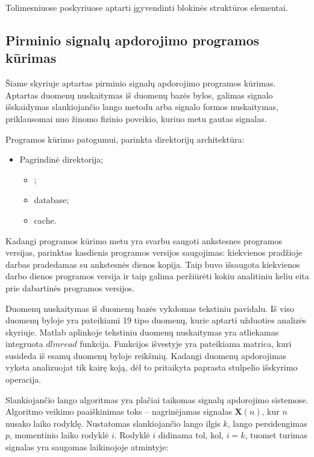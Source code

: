 \documentclass[]{vgtuef}
\begin{document}
Tolimesniuose poskyriuose aptarti įgyvendinti blokinės struktūros elementai.

\subsection{Pirminio signalų apdorojimo programos kūrimas}
\label{subsec:preprocessing}

Šiame skyriuje aptartas pirminio signalų apdorojimo programos kūrimas. Aptartas duomenų nuskaitymas iš duomenų bazės bylos, galimas signalo išskaidymas slankiojančio lango metodu arba signalo formos nuskaitymas, priklausomai nuo žinomo fizinio poveikio, kuriuo metu gautas signalas.

Programos kūrimo patogumui, parinkta direktorijų architektūra:

\begin{itemize}
\item Pagrindinė direktorija;
  \begin{itemize}
  \item <programos versija, nurodyta datos formatu>;
  \item database;
  \item cache.
  \end{itemize}
\end{itemize}

Kadangi programos kūrimo metu yra svarbu saugoti ankstesnes programos versijas, parinktas kasdienis programos versijos saugojimas: kiekvienos pradžioje darbas pradedamas su ankstesnės dienos kopija. Taip buvo išsaugota kiekvienos darbo dienos programos versija ir taip galima peržiūrėti kokiu analitiniu keliu eita prie dabartinės programos versijos.



Duomenų nuskaitymas iš duomenų bazės vykdomas tekstiniu pavidalu. Iš viso duomenų byloje yra pateikiami 19 tipo duomenų, kurie aptarti užduoties analizės skyriuje. Matlab aplinkoje tekstiniu duomenų nuskaitymas yra atliekamas integruota $dlmread$ funkcija. Funkcijos išvestyje yra pateikiama matrica, kuri susideda iš esamų duomenų byloje reikšmių. Kadangi duomenų apdorojimas vyksta analizuojat tik kairę koją, dėl to pritaikyta paprasta stulpelio išskyrimo operacija.


Slankiojančio lango algoritmas yra plačiai taikomas signalų apdorojimo sistemose. Algoritmo veikimo paaiškinimas toks -- nagrinėjamas signalas $\mathbf{X}(n)$, kur $n$ nusako laiko rodyklę. Nustatomas slankiojančio lango ilgis $k$, lango persidengimas $p$, momentinio laiko rodyklė $i$. Rodyklė $i$ didinama tol, kol, $i=k$, tuomet turimas signalas yra saugomas laikinojoje atmintyje:
\end{document}
